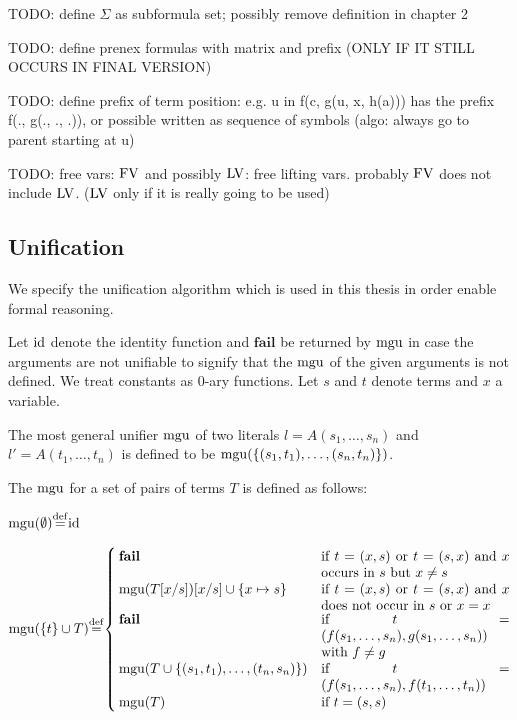 TODO: define $\Sigma$ as subformula set; possibly remove definition in chapter 2



TODO: define prenex formulas with matrix and prefix (ONLY IF IT STILL OCCURS IN FINAL VERSION)

TODO: define prefix of term position: e.g. u in f(c, g(u, x, h(a))) has the prefix f(., g(., ., .)), or possible written as sequence of symbols (algo: always go to parent starting at u)

TODO: free vars: $\operatorname{FV}$ and possibly $\operatorname{LV}$: free lifting vars. probably $\operatorname{FV}$ does not include $\operatorname{LV}$. ($\operatorname{LV}$ only if it is really going to be used)


\subsection{Unification}

We specify the unification algorithm which is used in this thesis in order enable formal reasoning.

	Let $\operatorname{id}$ denote the identity function and $\textbf{fail}$ be returned by $\operatorname{mgu}$ in case the arguments are not unifiable to signify that the $\operatorname{mgu}$ of the given arguments is not defined. We treat constants as $0$-ary functions.
	Let $s$ and $t$ denote terms and $x$ a variable.

	The most general unifier $\operatorname{mgu}$ of two literals $l = A(s_1,\dotsc, s_n)$ and $l' = A(t_1,\dots, t_n)$ is defined to be $\operatorname{mgu}(\{ (s_1, t_1), \dotsc, (s_n, t_n)\})$.


	The $\operatorname{mgu}$ for a set of pairs of terms $T$ is defined as follows:

	\noindent
	$
	\mgu(\emptyset) \defeq \id
	$

	\newcommand{\aatahfdgasdfg}{.4\textwidth}
	\noindent
	$
	\mbox{$\mgu(\{t\} \cup T)$} \defeq
	\begin{cases}
		\mathbf{fail} 				& \parbox[t]{\aatahfdgasdfg}{if $t = (x, s)$ or $t=(s,x)$ and $x$ occurs in $s$ but $x\neq s$ } \\
		\mgu(T\subst{x/s})\subst{x/s} \cup \{x\mapsto s\} 		& \parbox[t]{\aatahfdgasdfg}{if $t = (x, s)$ or $t=(s,x)$ and $x$ does not occur in $s$ or $x=x$} \\
		\mathbf{fail} 				& \parbox[t]{\aatahfdgasdfg}{if $t = (f(s_1,\dotsc,s_n), g(s_1,\dotsc,s_n))$ with $f\neq g$} \\
		\mgu(T \cup \{(s_1, t_1), \dotsc, (t_n, s_n)\})		& \parbox[t]{\aatahfdgasdfg}{if $t = (f(s_1,\dotsc,s_n), f(t_1,\dotsc,t_n))$} \\
		\mgu(T) 							& \text{if $t=(s, s)$} \\
	\end{cases}
	$

